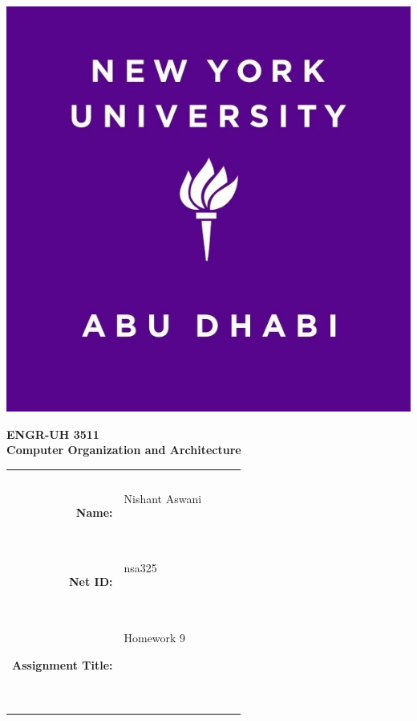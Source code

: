 \documentclass[11pt]{exam}
\newcommand{\myname}{Nishant Aswani}
\newcommand{\mynetid}{nsa325}
\newcommand{\myhwtype}{Homework}
\newcommand{\myhwnum}{9}
\newcommand{\mycoursenumber}{ENGR-UH 3511}
\newcommand{\myclassname}{Computer Organization and Architecture}
\begin{document}
\begin{center}
  \includegraphics[scale=0.15]{etc/NYUAD-alt-logo.jpg}
\end{center}

{\vspace{1.5em}}

\begin{center}
    \Huge{\textbf{\mycoursenumber}}\\
    {\vspace{0.5em}}
    \Huge{\textbf{\myclassname}}
\end{center}

{\vspace{10em}}

\begin{center}
  \begin{tabular}{|rp{5.0cm}lll|}
    \hline
    &  &  &  & \\
    &  &  &  & \\
    \Large{\textbf{Name:}} & \Large{\myname}
    
    \  &  &  & \\
    \Large{\textbf{Net ID:}} & \Large{\mynetid}
    
    \  &  &  & \\
    \Large{\textbf{Assignment Title:}} & \Large{\myhwtype{} \myhwnum}
    
    \
    
    \  &  &  & \\
    \hline
  \end{tabular}
\end{center}
\end{document}
